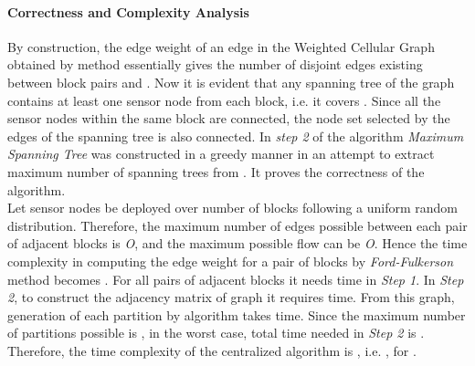 \documentclass{acm_proc_article-sp}
\begin{document}
 \paragraph{\bf Correctness and Complexity Analysis} 
 By construction, the edge weight  of an edge  in the Weighted Cellular Graph  obtained by  method essentially gives the number of disjoint edges existing between block pairs  and . Now it is evident that any spanning tree of the graph  contains at least one sensor node from each block, i.e. it covers . Since all the sensor nodes within the same block are connected, the node set selected by the edges of the spanning tree is also connected. In {\it step 2} of the algorithm {\it Maximum Spanning Tree} was constructed in a greedy manner in an attempt to extract maximum number of spanning trees from . It proves the correctness of the algorithm. \\ 
 Let  sensor nodes be deployed over  number of blocks following a uniform random distribution. Therefore, the maximum number of edges possible between each pair of adjacent blocks is {\it O}, and the maximum possible flow can be {\it O}. Hence the time complexity in computing the edge weight for a pair of blocks by {\it Ford-Fulkerson} method becomes . For all pairs of adjacent blocks it needs  time in {\it Step 1}. In {\it Step 2}, to construct the adjacency matrix of graph  it requires  time. From this graph, generation of each partition by  algorithm takes  time. Since the maximum number of partitions possible is , in the worst case, total time needed in {\it Step 2} is .
 Therefore, the time complexity of the centralized algorithm is , i.e. , for .
\vspace{-0.3cm}
\end{document}
